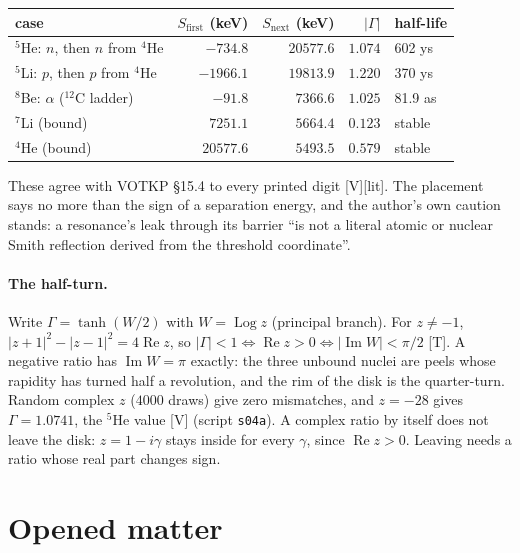 \documentclass[11pt]{article}
\theoremstyle{definition}
\newcommand{\grade}[1]{\textsf{\small[#1]}}
\begin{document}
\begin{center}
\begin{tabular}{lrrrl}\toprule
case & $S_{\mathrm{first}}$ (keV) & $S_{\mathrm{next}}$ (keV) & $|\Gamma|$ & half-life\\\midrule
${}^5$He: $n$, then $n$ from ${}^4$He & $-734.8$ & $20577.6$ & $1.074$ & 602 ys\\
${}^5$Li: $p$, then $p$ from ${}^4$He & $-1966.1$ & $19813.9$ & $1.220$ & 370 ys\\
${}^8$Be: $\alpha$ ($^{12}$C ladder) & $-91.8$ & $7366.6$ & $1.025$ & 81.9 as\\
${}^7$Li (bound) & $7251.1$ & $5664.4$ & $0.123$ & stable\\
${}^4$He (bound) & $20577.6$ & $5493.5$ & $0.579$ & stable\\\bottomrule
\end{tabular}
\end{center}
\noindent These agree with VOTKP §15.4 to every printed digit \grade{V}\grade{lit}. The placement says no more than the sign of a separation energy, and the author's own caution stands: a resonance's leak through its barrier ``is not a literal atomic or nuclear Smith reflection derived from the threshold coordinate''.

\paragraph{The half-turn.} Write $\Gamma=\tanh(W/2)$ with $W=\operatorname{Log}z$ (principal branch). For $z\neq-1$, $|z+1|^2-|z-1|^2=4\operatorname{Re}z$, so $|\Gamma|<1\iff\operatorname{Re}z>0\iff|\operatorname{Im}W|<\pi/2$ \grade{T}. A negative ratio has $\operatorname{Im}W=\pi$ exactly: the three unbound nuclei are peels whose rapidity has turned half a revolution, and the rim of the disk is the quarter-turn. Random complex $z$ ($4000$ draws) give zero mismatches, and $z=-28$ gives $\Gamma=1.0741$, the ${}^5$He value \grade{V} (script \texttt{s04a}). A complex ratio by itself does not leave the disk: $z=1-i\gamma$ stays inside for every $\gamma$, since $\operatorname{Re}z>0$. Leaving needs a ratio whose real part changes sign.

\section{Opened matter}
\end{document}

